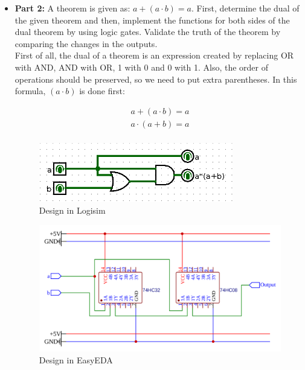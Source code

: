 \documentclass[pdftex,12pt,a4paper]{article}
\begin{document}
\begin{itemize}
    \item \textbf{Part 2:} A theorem is given as: $a + (a \cdot b) = a$. First, determine the dual of the given theorem and then, implement the functions for both sides of the dual theorem by using logic gates. Validate the truth of the theorem by comparing the changes in the outputs. \\
    
    First of all, the dual of a theorem is an expression created by replacing OR with AND, AND with OR, 1 with 0 and 0 with 1. Also, the order of operations should be preserved, so we need to put extra parentheses. In this formula, $(a \cdot b)$ is done first:
    
\begin{align*}
a + (a \cdot b) = a \tag{Original} \\
a \cdot (a+b) = a \tag{Dual} \\
\end{align*}

\begin{figure}[H]
\centering
\includegraphics[width=0.8\textwidth]{Logisim_part_2.png}	
\caption{Design in Logisim}
\end{figure}

\begin{figure}[H]
\centering
\includegraphics[width=\textwidth]{EasyEDA_part_2.png}	
\caption{Design in EasyEDA}
\end{figure}


\end{itemize}
\end{document}
